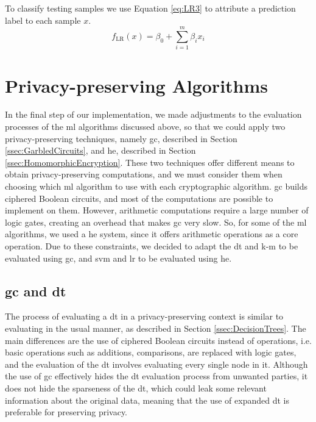 To classify testing samples we use Equation \ref{eq:LR3} to attribute a prediction label to each sample $x$.
\begin{equation}
\label{eq:LR3}
f_{\text{LR}}(x)=\beta_0+\sum_{i=1}^m \beta_i x_i
\end{equation}



\section{Privacy-preserving Algorithms}
\label{sec:CryptoDomainImplementation}

In the final step of our implementation, we made adjustments to the evaluation processes of the \ac{ml} algorithms discussed above, so that we could apply two privacy-preserving techniques, namely \ac{gc}, described in Section \ref{ssec:GarbledCircuits}, and \ac{he}, described in Section \ref{ssec:HomomorphicEncryption}.
These two techniques offer different means to obtain privacy-preserving computations, and we must consider them when choosing which \ac{ml} algorithm to use with each cryptographic algorithm. \ac{gc} builds ciphered Boolean circuits, and most of the computations are possible to implement on them. However, arithmetic computations require a large number of logic gates, creating an overhead that makes \ac{gc} very slow. So, for some of the \ac{ml} algorithms, we used a \ac{he} system, since it offers arithmetic operations as a core operation. Due to these constraints, we decided to adapt the \ac{dt} and \ac{k-m} to be evaluated using \ac{gc}, and \ac{svm} and \ac{lr} to be evaluated using \ac{he}.


\subsection{\acl{gc} and \acl{dt}}
\label{ssec:GCandDT}

The process of evaluating a \ac{dt} in a privacy-preserving context is similar to evaluating in the usual manner, as described in Section \ref{ssec:DecisionTrees}. The main differences are the use of ciphered Boolean circuits instead of operations, i.e. basic operations such as additions, comparisons, are replaced with logic gates, and the evaluation of the \ac{dt} involves evaluating every single node in it. Although the use of \ac{gc} effectively hides the \ac{dt} evaluation process from unwanted parties, it does not hide the sparseness of the \ac{dt}, which could leak some relevant information about the original data, meaning that the use of expanded \ac{dt} is preferable for preserving privacy.

